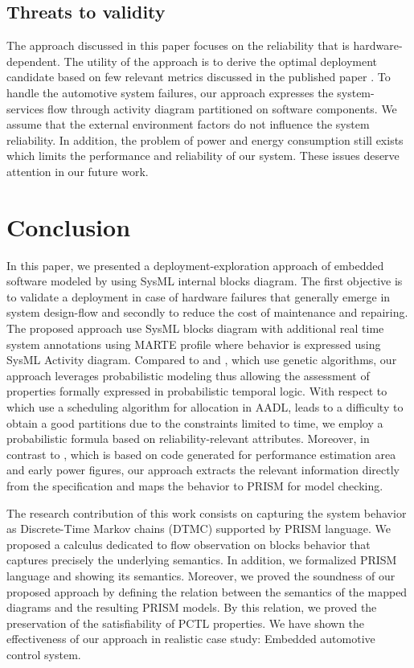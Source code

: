 \documentclass[3p,times,procedia,authoryear,round]{elsarticle}
\begin{document}
\subsection{Threats to validity}
The approach discussed in this paper focuses on the reliability that is hardware-dependent.  The utility of the approach is to derive the optimal deployment candidate based on few relevant metrics discussed in the published paper \citep{Meedeniya2011835}.  To handle the automotive system failures, our approach expresses the system-services flow through activity diagram partitioned on  software components. We assume that the external environment  factors do not influence the system reliability. In addition, the problem of power and energy consumption still exists which limits the performance and reliability of our system. These issues deserve attention in our  future work.

\section{Conclusion}
\label{section10}


In this paper, we presented a deployment-exploration approach of embedded software modeled by using SysML internal blocks diagram. The first objective is to validate a deployment in case of hardware failures that generally emerge in system design-flow and secondly to reduce the cost of maintenance and repairing. The proposed approach use SysML blocks diagram with additional real time system annotations using MARTE profile where behavior is expressed using SysML Activity diagram. Compared to \citep{Meedeniya2011835} and \citep{Thiruvady20141937}, which use genetic algorithms, our approach leverages probabilistic modeling thus allowing the assessment of properties formally expressed in probabilistic temporal logic. With respect to \citep{Besnard201554} which use a scheduling algorithm for allocation in AADL, leads to a difficulty to obtain a good partitions due to the constraints limited to time, we employ a probabilistic formula based on reliability-relevant
attributes. Moreover, in contrast to \citep{Brosse2012}, which is based on code generated for performance estimation area and early power figures, our approach extracts the relevant information directly from the specification and maps the behavior to PRISM for model checking.    

The research contribution of this work consists on capturing the system behavior as Discrete-Time Markov chains (DTMC) supported by PRISM language. We proposed a calculus dedicated to flow observation on blocks behavior that captures precisely the underlying semantics. In addition, we formalized PRISM language and showing its semantics. Moreover, we proved the soundness of our proposed approach by defining the relation between the semantics of the mapped diagrams and the resulting PRISM models. By this relation, we proved the preservation of the satisfiability of PCTL properties. We have shown the effectiveness of our approach in realistic case study: Embedded automotive control system. 
\end{document}
